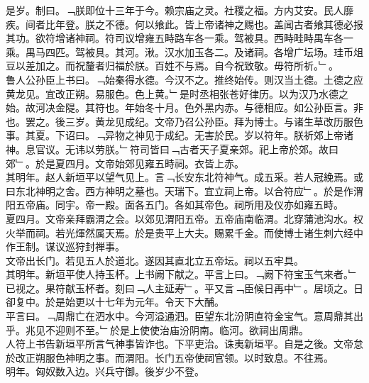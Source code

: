 \documentclass{zhvt-classic}
\begin{document}
\hspace*{2em}是岁。制曰。﹁朕即位十三年于今。赖宗庙之灵。社稷之福。方内艾安。民人靡疾。间者比年登。朕之不德。何以飨此。皆上帝诸神之赐也。盖闻古者飨其德必报其功。欲符增诸神祠。符司议增雍五畤路车各一乘。驾被具。西畤畦畤禺车各一乘。禺马四匹。驾被具。其河。湫。汉水加玉各二。及诸祠。各增广坛场。珪币俎豆以差加之。而祝釐者归福於朕。百姓不与焉。自今祝致敬。毋符所祈。﹂。\\
\hspace*{2em}鲁人公孙臣上书曰。﹁始秦得水德。今汉不之。推终始传。则汉当土德。土德之应黄龙见。宜改正朔。易服色。色上黄。﹂是时丞相张苍好律历。以为汉乃水德之始。故河决金隄。其符也。年始冬十月。色外黑内赤。与德相应。如公孙臣言。非也。罢之。後三岁。黄龙见成纪。文帝乃召公孙臣。拜为博士。与诸生草改历服色事。其夏。下诏曰。﹁异物之神见于成纪。无害於民。岁以符年。朕祈郊上帝诸神。息官议。无讳以劳朕。﹂符司皆曰﹁古者天子夏亲郊。祀上帝於郊。故曰郊﹂。於是夏四月。文帝始郊见雍五畤祠。衣皆上赤。\\
\hspace*{2em}其明年。赵人新垣平以望气见上。言﹁长安东北符神气。成五采。若人冠絻焉。或曰东北神明之舍。西方神明之墓也。天瑞下。宜立祠上帝。以合符应﹂。於是作渭阳五帝庙。同宇。帝一殿。面各五门。各如其帝色。祠所用及仪亦如雍五畤。\\
\hspace*{2em}夏四月。文帝亲拜霸渭之会。以郊见渭阳五帝。五帝庙南临渭。北穿蒲池沟水。权火举而祠。若光煇然属天焉。於是贵平上大夫。赐累千金。而使博士诸生刺六经中作王制。谋议巡狩封禅事。\\
\hspace*{2em}文帝出长门。若见五人於道北。遂因其直北立五帝坛。祠以五牢具。\\
\hspace*{2em}其明年。新垣平使人持玉杯。上书阙下献之。平言上曰。﹁阙下符宝玉气来者。﹂已视之。果符献玉杯者。刻曰﹁人主延寿﹂。平又言﹁臣候日再中﹂。居顷之。日卻复中。於是始更以十七年为元年。令天下大酺。\\
\hspace*{2em}平言曰。﹁周鼎亡在泗水中。今河溢通泗。臣望东北汾阴直符金宝气。意周鼎其出乎。兆见不迎则不至。﹂於是上使使治庙汾阴南。临河。欲祠出周鼎。\\
\hspace*{2em}人符上书告新垣平所言气神事皆诈也。下平吏治。诛夷新垣平。自是之後。文帝怠於改正朔服色神明之事。而渭阳。长门五帝使祠官领。以时致息。不往焉。\\
\hspace*{2em}明年。匈奴数入边。兴兵守御。後岁少不登。\\
\end{document}
